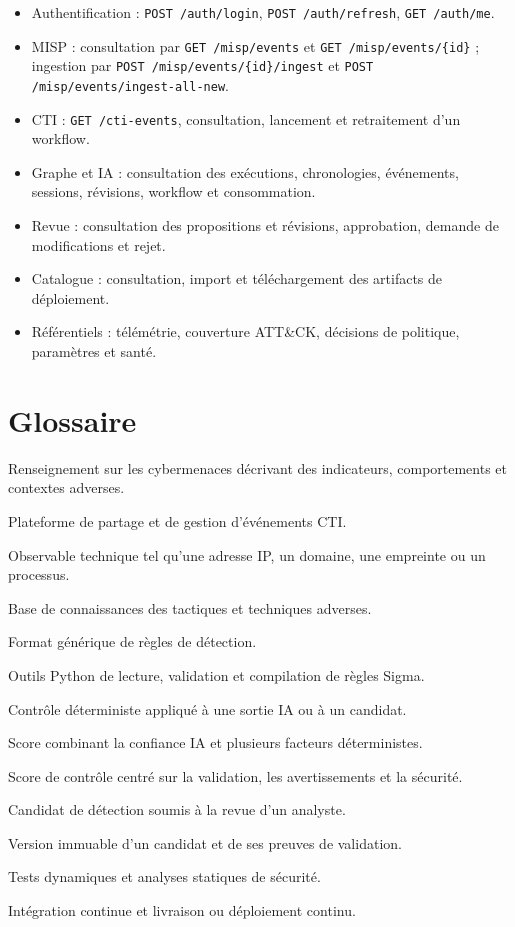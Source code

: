 \begin{itemize}[leftmargin=1.2cm]
    \item Authentification : \texttt{POST /auth/login}, \texttt{POST /auth/refresh}, \texttt{GET /auth/me}.
    \item MISP : consultation par \texttt{GET /misp/events} et \texttt{GET /misp/events/\{id\}} ; ingestion par \texttt{POST /misp/events/\{id\}/ingest} et \texttt{POST /misp/events/ingest-all-new}.
    \item CTI : \texttt{GET /cti-events}, consultation, lancement et retraitement d'un workflow.
    \item Graphe et IA : consultation des exécutions, chronologies, événements, sessions, révisions, workflow et consommation.
    \item Revue : consultation des propositions et révisions, approbation, demande de modifications et rejet.
    \item Catalogue : consultation, import et téléchargement des artifacts de déploiement.
    \item Référentiels : télémétrie, couverture ATT\&CK, décisions de politique, paramètres et santé.
\end{itemize}

\section*{Glossaire}

\begin{description}[leftmargin=3.5cm,style=nextline]
    \item[CTI] Renseignement sur les cybermenaces décrivant des indicateurs, comportements et contextes adverses.
    \item[MISP] Plateforme de partage et de gestion d'événements CTI.
    \item[IOC] Observable technique tel qu'une adresse IP, un domaine, une empreinte ou un processus.
    \item[MITRE ATT\&CK] Base de connaissances des tactiques et techniques adverses.
    \item[Sigma] Format générique de règles de détection.
    \item[pySigma] Outils Python de lecture, validation et compilation de règles Sigma.
    \item[Watcher] Contrôle déterministe appliqué à une sortie IA ou à un candidat.
    \item[Confiance] Score combinant la confiance IA et plusieurs facteurs déterministes.
    \item[Fiabilité] Score de contrôle centré sur la validation, les avertissements et la sécurité.
    \item[Proposition] Candidat de détection soumis à la revue d'un analyste.
    \item[Révision] Version immuable d'un candidat et de ses preuves de validation.
    \item[DAST / SAST] Tests dynamiques et analyses statiques de sécurité.
    \item[CI/CD] Intégration continue et livraison ou déploiement continu.
\end{description}